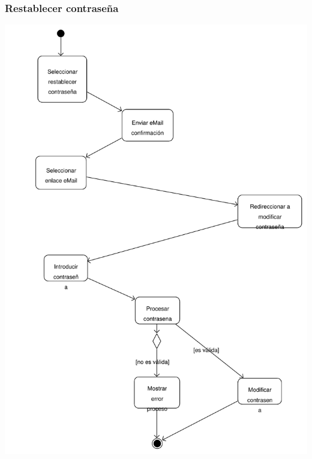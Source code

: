 \documentclass[11pt, a4paper, twoside, titlepage]{article}
\begin{document}
			\subsubsection{Restablecer contraseña}
				\begin{center}
					\includegraphics[scale=.8]{analisis/diagramas/da_restablecercontrasena.pdf}
				\end{center}
\end{document}

